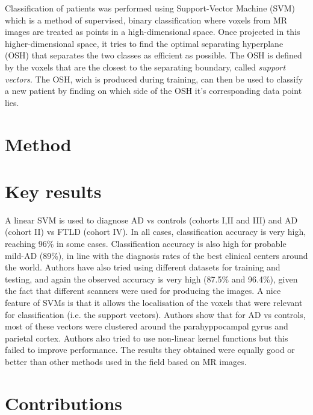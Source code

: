 \documentclass[11pt,a4paper,oneside]{report}
\begin{document}

Classification of patients was performed using Support-Vector Machine (SVM) which is a method of supervised, binary classification where voxels from MR images are treated as points in a high-dimensional space. Once projected in this higher-dimensional space, it tries to find the optimal separating hyperplane (OSH) that separates the two classes as efficient as possible. The OSH is defined by the voxels that are the closest to the separating boundary, called \emph{support vectors}. \cite{vapnik1998statistical,bishop2006pattern} The OSH, wich is produced during training, can then be used to classify a new patient by finding on which side of the OSH it's corresponding data point lies. 

\section*{Method}



\section*{Key results}

A linear SVM is used to diagnose AD vs controls (cohorts I,II and III) and AD (cohort II) vs FTLD (cohort IV). In all cases, classification accuracy is very high, reaching 96\% in some cases. Classification accuracy is also high for probable mild-AD (89\%), in line with the diagnosis rates of the best clinical centers around the world. Authors have also tried using different datasets for training and testing, and again the observed accuracy is very high (87.5\% and 96.4\%), given the fact that different scanners were used for producing the images. A nice feature of SVMs is that it allows the localisation of the voxels that were relevant for classification (i.e. the support vectors). Authors show that for AD vs controls, most of these vectors were clustered around the parahyppocampal gyrus and parietal cortex. Authors also tried to use non-linear kernel functions but this failed to improve performance. The results they obtained were equally good or better than other methods used in the field based on MR images. \cite{gosche2002hippocampal,jack2002antemortem,barnes2004differentiating,csernansky2004correlations,wahlund2005evidence} 

\section*{Contributions}
\end{document}
